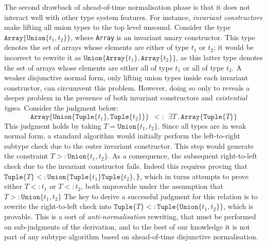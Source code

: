 \documentclass[a4paper,english]{lipics-v2019}
\newcommand{\xt}[1]{\texttt{#1}}
\newcommand{\union}[2]{\xt{Union\{}#1,#2\xt{\}}}
\newcommand{\tuple}[1]{\xt{Tuple\{}#1\xt{\}}}
\newcommand{\arrayt}[1]{\xt{Array\{}#1\xt{\}}}
\begin{document}
The second drawback of ahead-of-time normalisation phase is that it
does not interact well with other type system features. For instance,
\emph{invariant constructors} make lifting all union types to the top
level unsound.
Consider the type \(\arrayt{\union{t_1}{t_2}}\), where \texttt{Array}
is an invariant unary constructor.  This type
denotes the set of arrays whose elements are either of type \(t_1\) or
\(t_2\); it would be incorrect to rewrite it as
\(\union{\arrayt{t_1}}{\arrayt{t_2}}\),
as this latter type denotes the set of arrays
whose elements are either all of type \(t_1\) or all of type
\(t_2\).  A weaker disjunctive normal form, only lifting union types inside
each invariant constructor, can circumvent this
problem. However, doing so only to reveals a deeper problem in the presence of
 both invariant constructors and \emph{existential types}.
Consider the judgment below:
\[
  \arrayt{\union{\tuple{t_1}}{\tuple{t_2}}} \ \ <:\ \ \exists T\,.\, \arrayt{\tuple{T}}
\]
This judgment holds by taking \(T = \union{t_1}{t_2}\).  Since all
types are in weak normal form, a standard algorithm would initially
perform the left-to-right subtype check due to the outer invariant
constructor.  This step would generate the constraint \(T >:
\union{t_1}{t_2}\).  As a consequence, the subsequent right-to-left
check due to the invariant constructor fails.  Indeed this requires
proving that \(\tuple{T} <: \union{\tuple{t_1}\tuple{t_2}}\), which
in turns attempts to prove either \(T <: t_1\) or \(T <: t_2\),
both unprovable under the assumption that \(T >: \union{t_1}{t_2}\)
The key to derive a successful judgment for this relation is to rewrite the
right-to-left check into \(\tuple{T} <: \tuple{\union{t_1}{t_2}}\),
which is provable. This is a sort of \emph{anti-normalisation} rewriting, that
must be performed on sub-judgments of the derivation, and to the best
of our knowledge it is not part
of any subtype algorithm based on ahead-of-time disjunctive normalisation.


\end{document}
